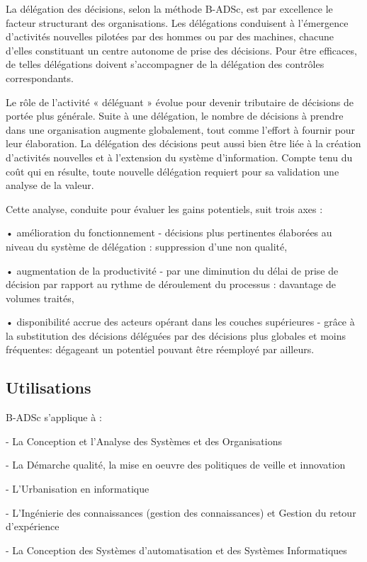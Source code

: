 La délégation des décisions, selon la méthode B-ADSc, est par excellence le facteur structurant des organisations. Les délégations conduisent à l’émergence d'activités nouvelles pilotées par des hommes ou par des machines, chacune d’elles constituant un centre autonome de prise des décisions. Pour être efficaces, de telles délégations doivent s’accompagner de la délégation des contrôles correspondants. 

Le rôle de l’activité « déléguant » évolue pour devenir tributaire de décisions de portée plus générale. Suite à une délégation, le nombre de décisions à prendre dans une organisation augmente globalement, tout comme l’effort à fournir pour leur élaboration.
La délégation des décisions peut aussi bien être liée à la création d'activités nouvelles et à l'extension du système d’information.
Compte tenu du coût qui en résulte, toute nouvelle délégation requiert pour sa validation une analyse de la valeur.

Cette analyse, conduite pour évaluer les gains potentiels, suit trois axes :

• amélioration du fonctionnement 
  - décisions plus pertinentes élaborées au niveau du système de délégation : suppression d’une non qualité, 
  
• augmentation de la productivité 
  - par une diminution du délai de prise de décision par rapport au rythme de déroulement du processus : davantage de volumes traités, 
  
• disponibilité accrue des acteurs opérant dans les couches supérieures 
  - grâce à la substitution des décisions déléguées par des décisions plus globales et moins fréquentes: dégageant un potentiel pouvant être réemployé par ailleurs. \cite{badsc}
 
\subsection{Utilisations}

 B-ADSc s'applique à :

- La Conception et l'Analyse des Systèmes et des Organisations	

- La Démarche qualité, la mise en oeuvre des politiques de veille et innovation

- L'Urbanisation en informatique 

- L'Ingénierie des connaissances (gestion des connaissances) et Gestion du retour d’expérience 

- La Conception des Systèmes d’automatisation et des Systèmes Informatiques 

